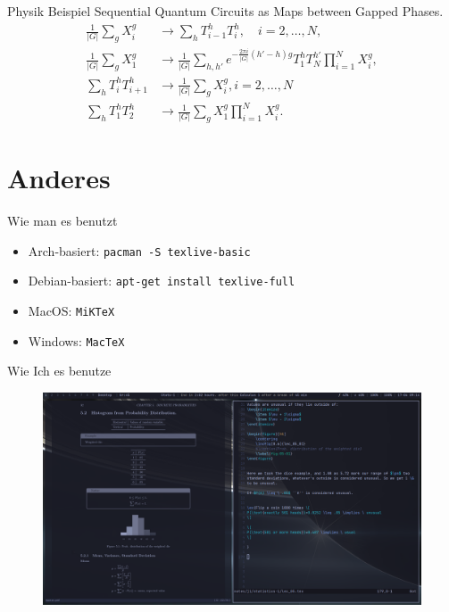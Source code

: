 \documentclass{beamer}
\begin{document}
\begin{frame}{Physik Beispiel}
    Sequential Quantum Circuits as Maps between Gapped Phases.\cite{chen2023sequential}
    \begin{align*}
        \frac{1}{|G|}\sum_g X^g_i &\to \sum_h T^h_{i-1}T^h_i, \quad i=2,\ldots,N,  \\
        \frac{1}{|G|} \sum_g X_1^g &\to \frac{1}{|G|} \sum_{h,h'}e^{-\frac{2\pi i}{|G|}(h'-h)g}T_1^hT^{h'}_N \prod^N_{i=1}X_i^g,  \\
        \sum_h T^h_i T^h_{i+1} &\to \frac{1}{|G|} \sum_g X_i^g, i=2,\ldots,N  \\
        \sum_h T^h_1 T^h_2 &\to \frac{1}{|G|} \sum_g X_1^g \prod_{i=1}^N X_i^g.
    \end{align*}
\end{frame}






\section{Anderes}
\begin{frame}{Wie man es benutzt}
    \begin{itemize}
        \item Arch-basiert: \Verb|pacman -S texlive-basic|
        \item Debian-basiert: \Verb|apt-get install texlive-full|
        \item MacOS: \Verb|MiKTeX|
        \item Windows: \Verb|MacTeX|
    \end{itemize}
\end{frame}



\begin{frame}{Wie Ich es benutze}
    \begin{figure}[htpb]
        \centering
        \includegraphics[width=\textwidth]{./figs/workflow.png}
        \label{fig:workflow-png}
    \end{figure}
\end{frame}
\end{document}
